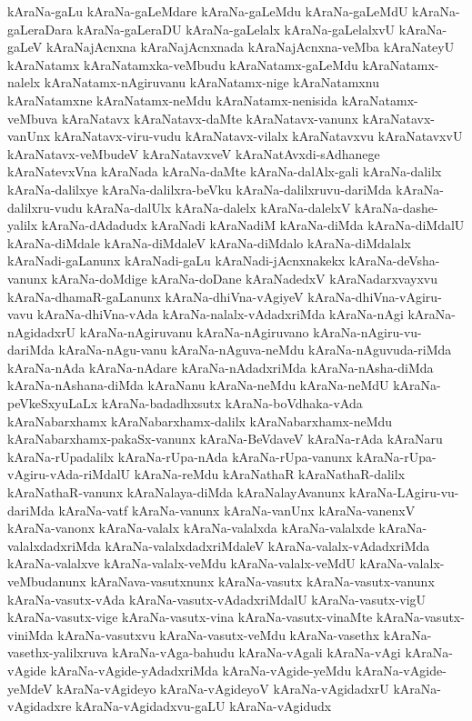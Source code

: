 {kAraNa-gaLu
kAraNa-gaLeMdare
kAraNa-gaLeMdu
kAraNa-gaLeMdU
kAraNa-gaLeraDara
kAraNa-gaLeraDU
kAraNa-gaLelalx
kAraNa-gaLelalxvU
kAraNa-gaLeV
kAraNajAcnxna
kAraNajAcnxnada
kAraNajAcnxna-veMba
kAraNateyU
kAraNatamx
kAraNatamxka-veMbudu
kAraNatamx-gaLeMdu
kAraNatamx-nalelx
kAraNatamx-nAgiruvanu
kAraNatamx-nige
kAraNatamxnu
kAraNatamxne
kAraNatamx-neMdu
kAraNatamx-nenisida
kAraNatamx-veMbuva
kAraNatavx
kAraNatavx-daMte
kAraNatavx-vanunx
kAraNatavx-vanUnx
kAraNatavx-viru-vudu
kAraNatavx-vilalx
kAraNatavxvu
kAraNatavxvU
kAraNatavx-veMbudeV
kAraNatavxveV
kAraNatAvxdi-sAdhanege
kAraNatevxVna
kAraNada
kAraNa-daMte
kAraNa-dalAlx-gali
kAraNa-dalilx
kAraNa-dalilxye
kAraNa-dalilxra-beVku
kAraNa-dalilxruvu-dariMda
kAraNa-dalilxru-vudu
kAraNa-dalUlx
kAraNa-dalelx
kAraNa-dalelxV
kAraNa-dashe-yalilx
kAraNa-dAdadudx
kAraNadi
kAraNadiM
kAraNa-diMda
kAraNa-diMdalU
kAraNa-diMdale
kAraNa-diMdaleV
kAraNa-diMdalo
kAraNa-diMdalalx
kAraNadi-gaLanunx
kAraNadi-gaLu
kAraNadi-jAcnxnakekx
kAraNa-deVsha-vanunx
kAraNa-doMdige
kAraNa-doDane
kAraNadedxV
kAraNadarxvayxvu
kAraNa-dhamaR-gaLanunx
kAraNa-dhiVna-vAgiyeV
kAraNa-dhiVna-vAgiru-vavu
kAraNa-dhiVna-vAda
kAraNa-nalalx-vAdadxriMda
kAraNa-nAgi
kAraNa-nAgidadxrU
kAraNa-nAgiruvanu
kAraNa-nAgiruvano
kAraNa-nAgiru-vu-dariMda
kAraNa-nAgu-vanu
kAraNa-nAguva-neMdu
kAraNa-nAguvuda-riMda
kAraNa-nAda
kAraNa-nAdare
kAraNa-nAdadxriMda
kAraNa-nAsha-diMda
kAraNa-nAshana-diMda
kAraNanu
kAraNa-neMdu
kAraNa-neMdU
kAraNa-peVkeSxyuLaLx
kAraNa-badadhxsutx
kAraNa-boVdhaka-vAda
kAraNabarxhamx
kAraNabarxhamx-dalilx
kAraNabarxhamx-neMdu
kAraNabarxhamx-pakaSx-vanunx
kAraNa-BeVdaveV
kAraNa-rAda
kAraNaru
kAraNa-rUpadalilx
kAraNa-rUpa-nAda
kAraNa-rUpa-vanunx
kAraNa-rUpa-vAgiru-vAda-riMdalU
kAraNa-reMdu
kAraNathaR
kAraNathaR-dalilx
kAraNathaR-vanunx
kAraNalaya-diMda
kAraNalayAvanunx
kAraNa-LAgiru-vu-dariMda
kAraNa-vatf
kAraNa-vanunx
kAraNa-vanUnx
kAraNa-vanenxV
kAraNa-vanonx
kAraNa-valalx
kAraNa-valalxda
kAraNa-valalxde
kAraNa-valalxdadxriMda
kAraNa-valalxdadxriMdaleV
kAraNa-valalx-vAdadxriMda
kAraNa-valalxve
kAraNa-valalx-veMdu
kAraNa-valalx-veMdU
kAraNa-valalx-veMbudanunx
kAraNava-vasutxnunx
kAraNa-vasutx
kAraNa-vasutx-vanunx
kAraNa-vasutx-vAda
kAraNa-vasutx-vAdadxriMdalU
kAraNa-vasutx-vigU
kAraNa-vasutx-vige
kAraNa-vasutx-vina
kAraNa-vasutx-vinaMte
kAraNa-vasutx-viniMda
kAraNa-vasutxvu
kAraNa-vasutx-veMdu
kAraNa-vasethx
kAraNa-vasethx-yalilxruva
kAraNa-vAga-bahudu
kAraNa-vAgali
kAraNa-vAgi
kAraNa-vAgide
kAraNa-vAgide-yAdadxriMda
kAraNa-vAgide-yeMdu
kAraNa-vAgide-yeMdeV
kAraNa-vAgideyo
kAraNa-vAgideyoV
kAraNa-vAgidadxrU
kAraNa-vAgidadxre
kAraNa-vAgidadxvu-gaLU
kAraNa-vAgidudx
}
